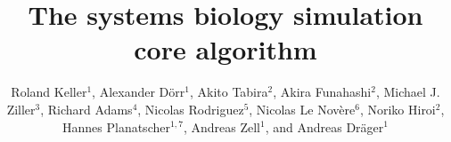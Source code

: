 \documentclass[10pt]{bmc_article}
\newenvironment{bmcformat}{\begin{raggedright}\baselineskip20pt\sloppy\setboolean{publ}{false}}{\end{raggedright}\baselineskip20pt\sloppy}
\begin{document}
\begin{bmcformat}



\title{The systems biology simulation core algorithm}



\author{%
Roland Keller$^{1}$, %
Alexander D\"orr$^{1}$, %
Akito Tabira$^{2}$, %
Akira Funahashi$^{2}$, %
Michael J. Ziller$^{3}$, %
Richard Adams$^{4}$, %
Nicolas Rodriguez$^{5}$, %
Nicolas Le Nov\`{e}re$^{6}$, %
Noriko Hiroi$^{2}$,%
Hannes Planatscher$^{1,7}$, %
Andreas Zell$^{1}$, %
and Andreas Dr\"ager$^{1}$\correspondingauthor{}%
}


\address{%
\iid(1)Center for Bioinformatics Tuebingen (ZBIT), University of
Tuebingen, T\"ubingen, Germany
\iid(2)Keio University, Graduate School of
Science and Technology, Yokohama, Japan 
\iid(3)Department of Stem Cell and Regenerative Biology, Harvard University,
Cambridge, MA, USA
\iid(4)SynthSys Edinburgh, CH Waddington Building, University of Edinburgh,
Edinburgh EH9 3JD, UK
\iid(5)European Bioinformatics Institute, Wellcome Trust Genome Campus, Hinxton,
Cambridge, UK
\iid(6)Babraham Institute, Babraham, Cambridge, UK
\iid(7)Present address: Natural and Medical Sciences Institute at the University of Tuebingen,
Reutlingen, Germany}


\end{bmcformat}
\end{document}
